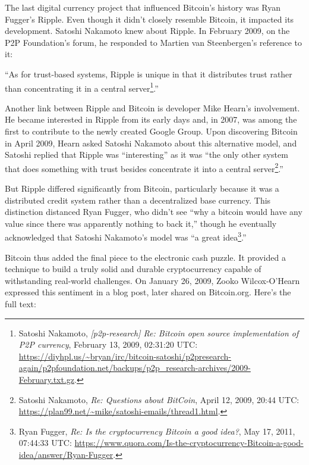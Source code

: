 \documentclass[
  a5paper,
  smalldemyvopaper,10pt,twoside,onecolumn,openright,extrafontsizes,hidelinks]{memoir}
\begin{document}
The last digital currency project that influenced Bitcoin's history was
Ryan Fugger's Ripple. Even though it didn't closely resemble Bitcoin, it
impacted its development. Satoshi Nakamoto knew about Ripple. In
February 2009, on the P2P Foundation's forum, he responded to Martien
van Steenbergen's reference to it:

``As for trust-based systems, Ripple is unique in that it distributes
trust rather than concentrating it in a central server\footnote{Satoshi
  Nakamoto, \emph{{[}p2p-research{]} Re: Bitcoin open source
  implementation of P2P currency}, February 13, 2009, 02:31:20 UTC:
  \url{https://diyhpl.us/~bryan/irc/bitcoin-satoshi/p2presearch-again/p2pfoundation.net/backups/p2p_research-archives/2009-February.txt.gz}.}.''

Another link between Ripple and Bitcoin is developer Mike Hearn's
involvement. He became interested in Ripple from its early days and, in
2007, was among the first to contribute to the newly created Google
Group. Upon discovering Bitcoin in April 2009, Hearn asked Satoshi
Nakamoto about this alternative model, and Satoshi replied that Ripple
was ``interesting'' as it was ``the only other system that does
something with trust besides concentrate it into a central
server\footnote{Satoshi Nakamoto, \emph{Re: Questions about BitCoin},
  April 12, 2009, 20:44 UTC:
  \url{https://plan99.net/~mike/satoshi-emails/thread1.html}.}.''

But Ripple differed significantly from Bitcoin, particularly because it
was a distributed credit system rather than a decentralized base
currency. This distinction distanced Ryan Fugger, who didn't see ``why a
bitcoin would have any value since there was apparently nothing to back
it,'' though he eventually acknowledged that Satoshi Nakamoto's model
was ``a great idea\footnote{Ryan Fugger, \emph{Re: Is the cryptocurrency
  Bitcoin a good idea?}, May 17, 2011, 07:44:33 UTC:
  \url{https://www.quora.com/Is-the-cryptocurrency-Bitcoin-a-good-idea/answer/Ryan-Fugger}.}.''

Bitcoin thus added the final piece to the electronic cash puzzle. It
provided a technique to build a truly solid and durable cryptocurrency
capable of withstanding real-world challenges. On January 26, 2009,
Zooko Wilcox-O'Hearn expressed this sentiment in a blog post, later
shared on Bitcoin.org. Here's the full text:
\end{document}
